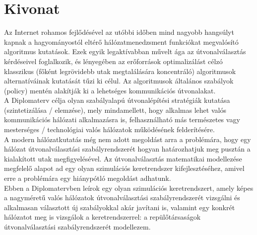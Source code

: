 \chapter*{Kivonat}

Az Internet rohamos fejlődésével az utóbbi időben mind nagyobb hangsúlyt kapnak a hagyományostól eltérő hálózatmenedzsment funkciókat megvalósító algoritmus kutatások. Ezek egyik legaktívabban művelt ága az útvonalválasztás kérdéseivel foglalkozik, és lényegében az erőforrások optimalizálást célzó klasszikus (főként legrövidebb utak megtalálására koncentráló) algoritmusok alternatíváinak kutatását tűzi ki célul. Az algoritmusok általános szabályok (policy) mentén alakítják ki a lehetséges kommunikációs útvonalakat.\\

A Diplomaterv célja olyan szabályalapú útvonalépítési stratégiák kutatása (szintetizálása / elemzése), mely mindamellett, hogy alkalmas lehet valós kommunikációs hálózati alkalmazásra is, felhasználható más természetes vagy mesterséges / technológiai valós hálózatok működésének felderítésére.\\

A modern hálózatkutatás még nem adott megoldást arra a problémára, hogy egy hálózat útvonalválasztási szabályrendszerét hogyan határozhatjuk meg pusztán a kialakított utak megfigyelésével. Az útvonalválasztás matematikai modellezése \cite{Compact_Policy_Routing} megfelelő alapot ad egy olyan szimulációs keretrendszer kifejlesztéséhez, amivel erre a problémára egy hiánypótló megoldást adhatunk.\\

Ebben a Diplomatervben leírok egy olyan szimulációs keretrendszert, amely képes a nagyméretű valós hálózatok útvonalválasztási szabályrendszerét vizsgálni és alkalmasan választott új szabályokkal akár javítani is, valamint egy konkrét hálózatot meg is vizsgálok a keretrendszerrel: a repülőtársaságok útvonalválasztási szabályrendszerét modellezem.

\vfill


\iffalse


\chapter*{Abstract}\addcontentsline{toc}{chapter}{Abstract}

This document is a \LaTeX-based skeleton for BSc/MSc~theses of students at the Electrical Engineering and Informatics Faculty, Budapest University of Technology and Economics. The usage of this skeleton is optional. It has been tested with the \emph{TeXLive} \TeX~implementation, and it requires the PDF-\LaTeX~compiler.
\vfill

\fi
